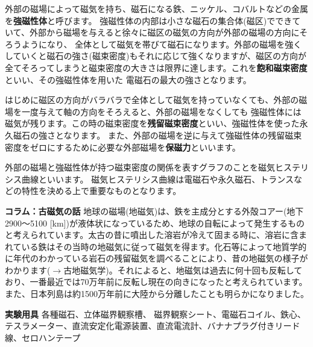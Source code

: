 外部の磁場によって磁気を持ち、磁石になる鉄、ニッケル、コバルトなどの金属を{\bf 強磁性体}と呼びます。
強磁性体の内部は小さな磁石の集合体(磁区)でできていて、外部から磁場を与えると徐々に磁区の磁気の方向が外部の磁場の方向にそろうようになり、
全体として磁気を帯びて磁石になります。外部の磁場を強くしていくと磁石の強さ(磁束密度)もそれに応じて強くなりますが、磁区の方向が
全てそろってしまうと磁束密度の大きさは限界に達します。これを{\bf 飽和磁束密度}といい、その強磁性体を用いた
電磁石の最大の強さとなります。

はじめに磁区の方向がバラバラで全体として磁気を持っていなくても、外部の磁場を一度与えて軸の方向をそろえると、外部の磁場をなくしても
強磁性体には磁気が残ります。この時の磁束密度を{\bf 残留磁束密度}といい、強磁性体を使った永久磁石の強さとなります。
また、外部の磁場を逆に与えて強磁性体の残留磁束密度をゼロにするために必要な外部磁場を{\bf 保磁力}といいます。

外部の磁場と強磁性体が持つ磁束密度の関係を表すグラフのことを磁気ヒステリシス曲線といいます。
磁気ヒステリシス曲線は電磁石や永久磁石、トランスなどの特性を決める上で重要なものとなります。



\bigskip

\begin{itembox}[l]{\bf コラム：古磁気の話}
地球の磁場(地磁気)は、鉄を主成分とする外殻コアー(地下2900〜5100 [km])が液体状になっているため、地球の自転によって発生するものと考えられています。太古の昔に噴出した溶岩が冷えて固まる時に、溶岩に含まれている鉄はその当時の地磁気に従って磁気を得ます。化石等によって地質学的に年代のわかっている岩石の残留磁気を調べることにより、昔の地磁気の様子がわかります($\rightarrow$古地磁気学)。それによると、地磁気は過去に何十回も反転しており、一番最近では70万年前に反転し現在の向きになったと考えられています。また、日本列島は約1500万年前に大陸から分離したことも明らかになりました。
\end{itembox}




\newpage

\jikken

\begin{itemsquarebox}[c]{\bf 実験用具}
各種磁石、立体磁界観察槽、%
磁界観察シート、電磁石コイル、鉄心、テスラメーター、直流安定化電源装置、直流電流計、バナナプラグ付きリード線、セロハンテープ
\end{itemsquarebox}

\bigskip

%
%
%
%
%
%
%


